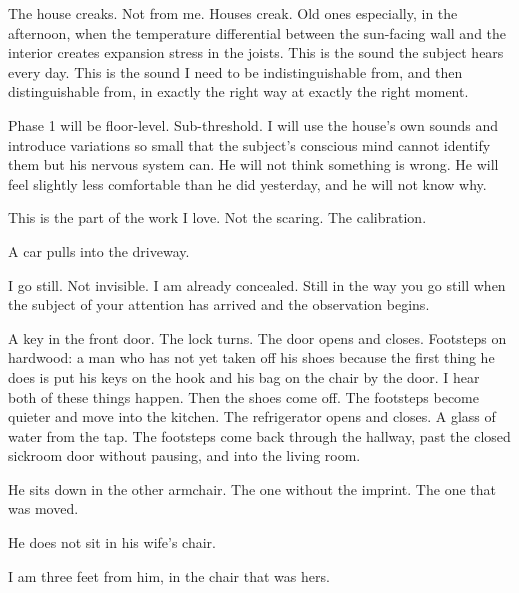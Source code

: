 The house creaks. Not from me. Houses creak. Old ones especially, in the afternoon, when the temperature differential between the sun-facing wall and the interior creates expansion stress in the joists. This is the sound the subject hears every day. This is the sound I need to be indistinguishable from, and then distinguishable from, in exactly the right way at exactly the right moment.

Phase 1 will be floor-level. Sub-threshold. I will use the house's own sounds and introduce variations so small that the subject's conscious mind cannot identify them but his nervous system can. He will not think something is wrong. He will feel slightly less comfortable than he did yesterday, and he will not know why.

This is the part of the work I love. Not the scaring. The calibration.

A car pulls into the driveway.

I go still. Not invisible. I am already concealed. Still in the way you go still when the subject of your attention has arrived and the observation begins.

A key in the front door. The lock turns. The door opens and closes. Footsteps on hardwood: a man who has not yet taken off his shoes because the first thing he does is put his keys on the hook and his bag on the chair by the door. I hear both of these things happen. Then the shoes come off. The footsteps become quieter and move into the kitchen. The refrigerator opens and closes. A glass of water from the tap. The footsteps come back through the hallway, past the closed sickroom door without pausing, and into the living room.

He sits down in the other armchair. The one without the imprint. The one that was moved.

He does not sit in his wife's chair.

I am three feet from him, in the chair that was hers.
